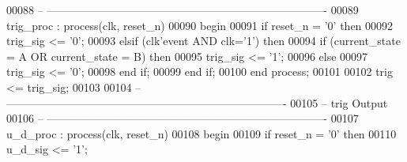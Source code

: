 \begin{DoxyCode}
00088 \textcolor{keyword}{-- ----------------------------------------------------------------------------}
00089 trig\_proc : \textcolor{keywordflow}{process}(clk, reset_n)
00090 \textcolor{vhdlkeyword}{begin}
00091    \textcolor{keywordflow}{if} \textcolor{vhdlchar}{reset_n} \textcolor{vhdlchar}{=} \textcolor{vhdlchar}{'}\textcolor{vhdllogic}{}\textcolor{vhdllogic}{0}\textcolor{vhdlchar}{'} \textcolor{keywordflow}{then} 
00092       \textcolor{vhdlchar}{trig_sig} \textcolor{vhdlchar}{<=} \textcolor{vhdlchar}{'}\textcolor{vhdllogic}{}\textcolor{vhdllogic}{0}\textcolor{vhdlchar}{'};
00093    \textcolor{keywordflow}{elsif} \textcolor{vhdlchar}{(}\textcolor{vhdlchar}{clk}\textcolor{vhdlchar}{'}\textcolor{vhdlkeyword}{event} \textcolor{keywordflow}{AND} \textcolor{vhdlchar}{clk}\textcolor{vhdlchar}{=}\textcolor{vhdlchar}{'}\textcolor{vhdllogic}{}\textcolor{vhdllogic}{1}\textcolor{vhdlchar}{'}\textcolor{vhdlchar}{)} \textcolor{keywordflow}{then} 
00094       \textcolor{keywordflow}{if} \textcolor{vhdlchar}{(}\textcolor{vhdlchar}{current_state} \textcolor{vhdlchar}{=} \textcolor{vhdlchar}{A} \textcolor{keywordflow}{OR} \textcolor{vhdlchar}{current_state} \textcolor{vhdlchar}{=} \textcolor{vhdlchar}{B}\textcolor{vhdlchar}{)} \textcolor{keywordflow}{then}
00095          \textcolor{vhdlchar}{trig_sig} \textcolor{vhdlchar}{<=} \textcolor{vhdlchar}{'}\textcolor{vhdllogic}{}\textcolor{vhdllogic}{1}\textcolor{vhdlchar}{'};
00096       \textcolor{keywordflow}{else} 
00097          \textcolor{vhdlchar}{trig_sig} \textcolor{vhdlchar}{<=} \textcolor{vhdlchar}{'}\textcolor{vhdllogic}{}\textcolor{vhdllogic}{0}\textcolor{vhdlchar}{'};
00098       \textcolor{keywordflow}{end} \textcolor{keywordflow}{if};
00099    \textcolor{keywordflow}{end} \textcolor{keywordflow}{if};
00100 \textcolor{keywordflow}{end} \textcolor{keywordflow}{process};
00101 
00102 \textcolor{vhdlchar}{trig} \textcolor{vhdlchar}{<=} \textcolor{vhdlchar}{trig_sig};
00103 
00104 \textcolor{keyword}{-- ----------------------------------------------------------------------------}
00105 \textcolor{keyword}{-- trig Output}
00106 \textcolor{keyword}{-- ----------------------------------------------------------------------------}
00107 u\_d\_proc : \textcolor{keywordflow}{process}(clk, reset_n)
00108 \textcolor{vhdlkeyword}{begin}
00109    \textcolor{keywordflow}{if} \textcolor{vhdlchar}{reset_n} \textcolor{vhdlchar}{=} \textcolor{vhdlchar}{'}\textcolor{vhdllogic}{}\textcolor{vhdllogic}{0}\textcolor{vhdlchar}{'} \textcolor{keywordflow}{then} 
00110       \textcolor{vhdlchar}{u_d_sig} \textcolor{vhdlchar}{<=} \textcolor{vhdlchar}{'}\textcolor{vhdllogic}{}\textcolor{vhdllogic}{1}\textcolor{vhdlchar}{'};

\end{DoxyCode}
